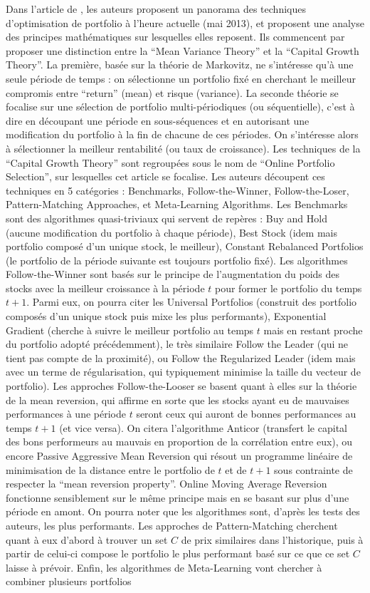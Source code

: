 \documentclass[a4paper, 10pt]{article}
\begin{document}
Dans l'article de \textbf{\citet{Li2014} }, les auteurs proposent un panorama des techniques d'optimisation de portfolio à l'heure actuelle (mai 2013), et proposent une analyse des principes mathématiques sur lesquelles elles reposent. Ils commencent par proposer une distinction entre la ``Mean Variance Theory'' et la ``Capital Growth Theory''. La première, basée sur la théorie de Markovitz, ne s'intéresse qu'à une seule période de temps : on sélectionne un portfolio fixé en cherchant le meilleur compromis entre ``return'' (mean) et risque (variance). La seconde théorie se focalise sur une sélection de portfolio multi-périodiques (ou séquentielle), c'est à dire en découpant une période en sous-séquences et en autorisant une modification du portfolio à la fin de chacune de ces périodes. On s'intéresse alors à sélectionner la meilleur rentabilité (ou taux de croissance). Les techniques de la ``Capital Growth Theory'' sont regroupées sous le nom de ``Online Portfolio Selection'', sur lesquelles cet article se focalise. Les auteurs découpent ces techniques en 5 catégories : Benchmarks, Follow-the-Winner, Follow-the-Loser, Pattern-Matching Approaches, et Meta-Learning Algorithms. Les Benchmarks sont des algorithmes quasi-triviaux qui servent de repères : Buy and Hold (aucune modification du portfolio à chaque période), Best Stock (idem mais portfolio composé d'un unique stock, le meilleur), Constant Rebalanced Portfolios (le portfolio de la période suivante est toujours portfolio fixé). Les algorithmes Follow-the-Winner sont basés sur le principe de l'augmentation du poids des stocks avec la meilleur croissance à la période $t$ pour former le portfolio du temps $t+1$. Parmi eux, on pourra citer les Universal Portfolios (construit des portfolio composés d'un unique stock puis mixe les plus performants), Exponential Gradient (cherche à suivre le meilleur portfolio au temps $t$ mais en restant proche du portfolio adopté précédemment), le très similaire Follow the Leader (qui ne tient pas compte de la proximité), ou Follow the Regularized Leader (idem mais avec un terme de régularisation, qui typiquement minimise la taille du vecteur de portfolio). Les approches Follow-the-Looser se basent quant à elles sur la théorie de la mean reversion, qui affirme en sorte que les stocks ayant eu de mauvaises performances à une période $t$ seront ceux qui auront de bonnes performances au temps $t+1$ (et vice versa). On citera l'algorithme Anticor (transfert le capital des bons performeurs au mauvais en proportion de la corrélation entre eux), ou encore Passive Aggressive Mean Reversion qui résout un programme linéaire de minimisation de la distance entre le portfolio de $t$ et de $t+1$ sous contrainte de respecter la ``mean reversion property''. Online Moving Average Reversion fonctionne sensiblement sur le même principe mais en se basant sur plus d'une période en amont. On pourra noter que les algorithmes sont, d'après les tests des auteurs, les plus performants. Les approches de Pattern-Matching cherchent quant à eux d'abord à trouver un set $C$ de prix similaires dans l'historique, puis à partir de celui-ci compose le portfolio le plus performant basé sur ce que ce set $C$ laisse à prévoir. Enfin, les algorithmes de Meta-Learning vont chercher à combiner plusieurs portfolios 
\end{document}
